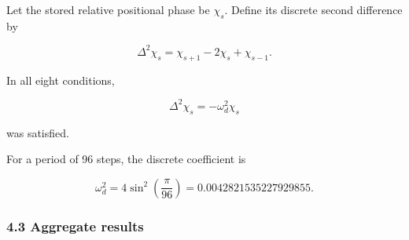 \documentclass[
  10pt,
  a4paper,
]{article}
\begin{document}
Let the stored relative positional phase be \(\chi_s\). Define its
discrete second difference by

\[
\Delta^2\chi_s
=\chi_{s+1}-2\chi_s+\chi_{s-1}.
\]

In all eight conditions,

\[
\Delta^2\chi_s
=-\omega_d^2\chi_s
\]

was satisfied.

For a period of 96 steps, the discrete coefficient is

\[
\omega_d^2
=4\sin^2\left(\frac{\pi}{96}\right)
=0.0042821535227929855.
\]

\subsubsection{4.3 Aggregate results}\label{aggregate-results}
\end{document}
